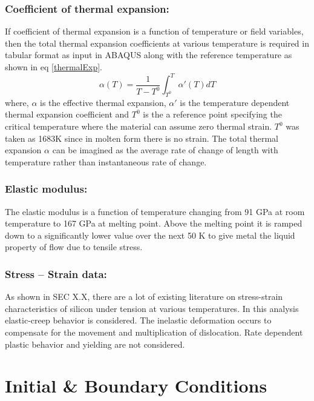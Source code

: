 \subsubsection{Coefficient of thermal expansion:}

If coefficient of thermal expansion is a function of temperature or field variables, then the total thermal expansion coefficients at various temperature is required in tabular format as input in ABAQUS along with the reference temperature as shown in eq \ref{thermalExp}.
\begin{equation}
\alpha(T) = \frac{1}{T-T^{0}}\int_{T^{0}}^{T} {\alpha}'(T)dT
\label {thermalExp}
\end{equation}
where, $\alpha$ is the effective thermal expansion, ${\alpha}'$ is the temperature dependent thermal expansion coefficient and $T^{0}$ is the a reference point specifying the critical temperature where the material can assume zero thermal strain. $T^{0}$ was taken as 1683K since in molten form there is no strain. The total thermal expansion $\alpha$ can be imagined as the average rate of change of length with temperature rather than instantaneous rate of change.  

\subsubsection{Elastic modulus:}

The elastic modulus is a function of temperature changing from 91 GPa at room temperature to 167 GPa at melting point. Above the melting point it is ramped down to a significantly lower value over the next 50 K to give metal the liquid property of flow due to tensile stress.

\subsubsection{Stress – Strain data:}

As shown in SEC X.X, there are a lot of existing literature on stress-strain characteristics of silicon under tension at various temperatures. In this analysis elastic-creep behavior is considered. The inelastic deformation occurs to compensate for the movement and multiplication of dislocation. Rate dependent plastic behavior and yielding are not considered.


\section{Initial \& Boundary Conditions}


